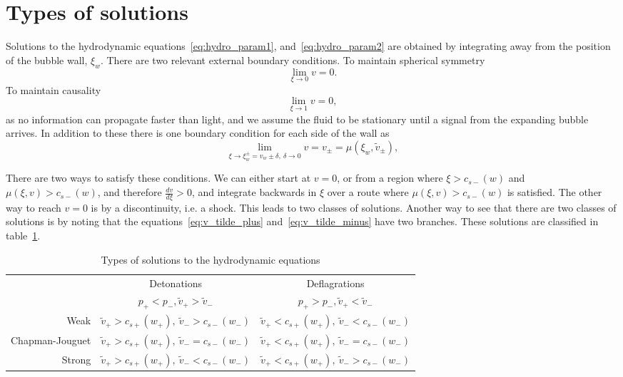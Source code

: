 \section{Types of solutions}
\label{solution_types}
Solutions to the hydrodynamic equations~\eqref{eq:hydro_param1}, and~\eqref{eq:hydro_param2} are obtained by integrating away from the position of the bubble wall, $\xi_w$.
There are two relevant external boundary conditions.
To maintain spherical symmetry
\begin{equation}
\lim_{\xi \rightarrow 0} v = 0.
\end{equation}
To maintain causality
\begin{equation}
\lim_{\xi \rightarrow 1} v = 0,
\end{equation}
as no information can propagate faster than light, and we assume the fluid to be stationary until a signal from the expanding bubble arrives.
In addition to these there is one boundary condition for each side of the wall as
\begin{equation}
\lim_{\xi \rightarrow \xi_w^\pm = v_w \pm \delta, \ \delta \rightarrow 0} v = v_\pm = \mu (\xi_w, \tilde{v}_\pm),
\end{equation}

There are two ways to satisfy these conditions.
We can either start at $v=0$, or from a region where $\xi > c_{s-}(w)$ and $\mu(\xi,v) > c_{s-}(w)$, and therefore $\frac{dv}{d\xi} > 0$,
and integrate backwards in $\xi$ over a route where $\mu(\xi,v) > c_{s-}(w)$ is satisfied.
The other way to reach $v=0$ is by a discontinuity, i.e. a shock.
This leads to two classes of solutions.
Another way to see that there are two classes of solutions is by noting
that the equations~\eqref{eq:v_tilde_plus} and~\eqref{eq:v_tilde_minus} have two branches.
These solutions are classified in table~\ref{table:solution_types}.

\begin{table}[ht!]
\small
\caption{Types of solutions to the hydrodynamic equations}
\begin{tabular}{r|c|c}
                & Detonations            & Deflagrations \\
                & $p_+ < p_-, \tilde{v}_+ > \tilde{v}_-$ & $p_+ > p_-, \tilde{v}_+ < \tilde{v}_-$ \\ \hline
Weak            & $\tilde{v}_+ > c_{s+}(w_+), \ \tilde{v}_- > c_{s-}(w_-)$ & $\tilde{v}_+ < c_{s+}(w_+), \ \tilde{v}_- < c_{s-}(w_-)$ \\
Chapman-Jouguet & $\tilde{v}_+ > c_{s+}(w_+), \ \tilde{v}_- = c_{s-}(w_-)$ & $\tilde{v}_+ < c_{s+}(w_+), \ \tilde{v}_- = c_{s-}(w_-)$ \\
Strong          & {\color{gray} $\tilde{v}_+ > c_{s+}(w_+), \ \tilde{v}_- < c_{s-}(w_-)$} & {\color{gray} $\tilde{v}_+ < c_{s+}(w_+), \ \tilde{v}_- > c_{s-}(w_-)$} \\
\end{tabular}
\label{table:solution_types}
\end{table}

